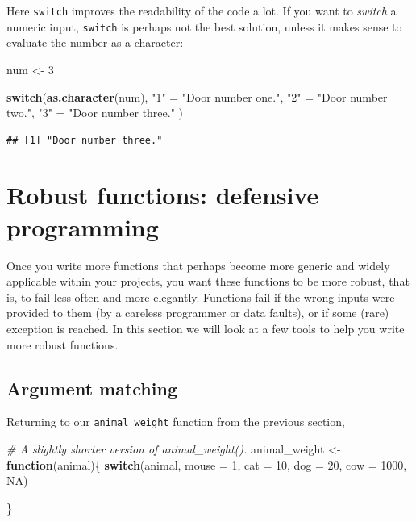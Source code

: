 \documentclass[]{book}
\newenvironment{Shaded}{\begin{snugshade}}{\end{snugshade}}
\newcommand{\CommentTok}[1]{\textcolor[rgb]{0.56,0.35,0.01}{\textit{#1}}}
\newcommand{\ControlFlowTok}[1]{\textcolor[rgb]{0.13,0.29,0.53}{\textbf{#1}}}
\newcommand{\DataTypeTok}[1]{\textcolor[rgb]{0.13,0.29,0.53}{#1}}
\newcommand{\DecValTok}[1]{\textcolor[rgb]{0.00,0.00,0.81}{#1}}
\newcommand{\KeywordTok}[1]{\textcolor[rgb]{0.13,0.29,0.53}{\textbf{#1}}}
\newcommand{\NormalTok}[1]{#1}
\newcommand{\OtherTok}[1]{\textcolor[rgb]{0.56,0.35,0.01}{#1}}
\newcommand{\StringTok}[1]{\textcolor[rgb]{0.31,0.60,0.02}{#1}}
\begin{document}
Here \texttt{switch} improves the readability of the code a lot. If you want to \emph{switch} a numeric input, \texttt{switch} is perhaps not the best solution, unless it makes sense to evaluate the number as a character:

\begin{Shaded}
\begin{Highlighting}[]
\NormalTok{num <-}\StringTok{ }\DecValTok{3}

\ControlFlowTok{switch}\NormalTok{(}\KeywordTok{as.character}\NormalTok{(num),}
       \StringTok{"1"}\NormalTok{ =}\StringTok{ "Door number one."}\NormalTok{,}
       \StringTok{"2"}\NormalTok{ =}\StringTok{ "Door number two."}\NormalTok{,}
       \StringTok{"3"}\NormalTok{ =}\StringTok{ "Door number three."}
\NormalTok{       )}
\end{Highlighting}
\end{Shaded}

\begin{verbatim}
## [1] "Door number three."
\end{verbatim}

\hypertarget{robust-functions-defensive-programming}{%
\section{Robust functions: defensive programming}\label{robust-functions-defensive-programming}}

Once you write more functions that perhaps become more generic and widely applicable within your projects, you want these functions to be more robust, that is, to fail less often and more elegantly. Functions fail if the wrong inputs were provided to them (by a careless programmer or data faults), or if some (rare) exception is reached. In this section we will look at a few tools to help you write more robust functions.

\hypertarget{argument-matching}{%
\subsection{Argument matching}\label{argument-matching}}

Returning to our \texttt{animal\_weight} function from the previous section,

\begin{Shaded}
\begin{Highlighting}[]
\CommentTok{# A slightly shorter version of animal_weight().}
\NormalTok{animal_weight <-}\StringTok{ }\ControlFlowTok{function}\NormalTok{(animal)\{}
  \ControlFlowTok{switch}\NormalTok{(animal, }
             \DataTypeTok{mouse =} \DecValTok{1}\NormalTok{,}
             \DataTypeTok{cat =} \DecValTok{10}\NormalTok{,}
             \DataTypeTok{dog =} \DecValTok{20}\NormalTok{,}
             \DataTypeTok{cow =} \DecValTok{1000}\NormalTok{,}
             \OtherTok{NA}\NormalTok{)}
              
\NormalTok{\}}
\end{Highlighting}
\end{Shaded}
\end{document}
